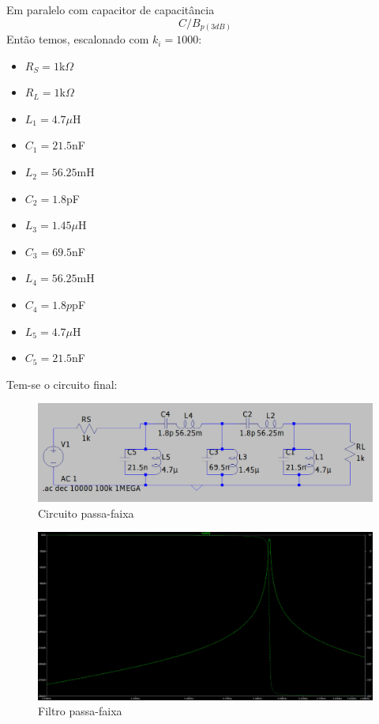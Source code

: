 \documentclass[14pt, oneside]{book}
\theoremstyle{definition}
\begin{document}
            Em paralelo com capacitor de capacitância
            \begin{equation}
            C/B_{p(3dB)}
            \end{equation}
            Então temos, escalonado com $k_i = 1000$:
            \begin{itemize}
                \item $R_S = 1$k$\Omega$
                \item $R_L = 1$k$\Omega$
                \item $L_1 = 4.7\mu$H
                \item $C_1 =21.5$nF
                \item $L_2= 56.25$mH
                \item $C_2 = 1.8$pF
                \item $L_3= 1.45\mu$H
                \item $C_3 = 69.5$nF
                \item $L_4= 56.25$mH
                \item $C_4 = 1.8p$pF
                \item $L_5= 4.7\mu$H
                \item $C_5 = 21.5$nF
            \end{itemize}
            
            Tem-se o circuito final:
            
            \begin{figure}[H]
                \centering
                \includegraphics[scale=0.4]{FINAL.jpeg}
                \caption{Circuito passa-faixa}
            \end{figure}
            
            \begin{figure}[H]
                \centering
                \includegraphics[scale=0.4]{passando.jpeg}
                \caption{Filtro passa-faixa}
            \end{figure}
            
\end{document}
